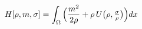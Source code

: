 \documentclass[preview]{standalone}
\begin{document}
\begin{align*}
\special{dvisvgm:raw <g id='unique000'>}H[\rho,m,\sigma]=\int_\Omega\Big(\frac{m^2}{2\rho}+\rho\,U\big(\rho,\tfrac{\sigma}{\rho}\big)\Big)dx\special{dvisvgm:raw </g>}
\end{align*}
\end{document}
